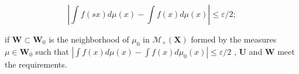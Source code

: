 \[
\left| \int f (s x) d \mu (x) - \int f (x) d \mu (x) \right| \leqslant \varepsilon / 2;
\]

if \(\mathbf{W} \subset \mathbf{W}_0\) is the neighborhood of \(\mu_0\) in \(\mathcal{M}_{+}(\mathbf{X})\) formed by the measures \(\mu \in \mathbf{W}_0\) such that \(|\int f(x) d\mu(x) - \int f(x) d\mu_0(x)| \leqslant \varepsilon/2\) , \(\mathbf{U}\) and \(\mathbf{W}\) meet the requirements.

